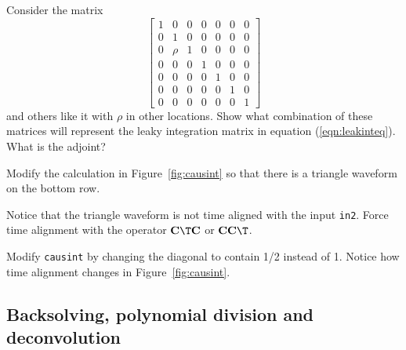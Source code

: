 \begin{exer}

\item
Consider the matrix
\begin{equation}
  \left[
        \begin{array}{cccccccc}
             1 &     0 &     0 &     0 &     0 &     0 &     0 \\
             0 &     1 &     0 &     0 &     0 &     0 &     0 \\
             0 &  \rho &     1 &     0 &     0 &     0 &     0 \\
             0 &     0 &     0 &     1 &     0 &     0 &     0 \\
             0 &     0 &     0 &     0 &     1 &     0 &     0 \\
             0 &     0 &     0 &     0 &     0 &     1 &     0 \\
             0 &     0 &     0 &     0 &     0 &     0 &     1 
        \end{array}
  \right]
\end{equation}
and others like it with $\rho$ in other locations.
Show what combination of these matrices will represent
the leaky integration matrix
in equation (\ref{eqn:leakinteq}).  What is the adjoint?

\item
Modify the calculation in Figure~\ref{fig:causint} so that there is
a triangle waveform on the bottom row.
\item
Notice that the triangle waveform is not time aligned
with the input {\tt in2}.
Force time alignment with the operator 
${\bold C\T \bold C}$ or
${\bold C  \bold C\T}$.
\item
Modify \texttt{causint}  by changing the diagonal to contain
1/2 instead of 1.
Notice how time alignment changes in Figure~\ref{fig:causint}.
\end{exer}




\subsection{Backsolving, polynomial division and deconvolution}

